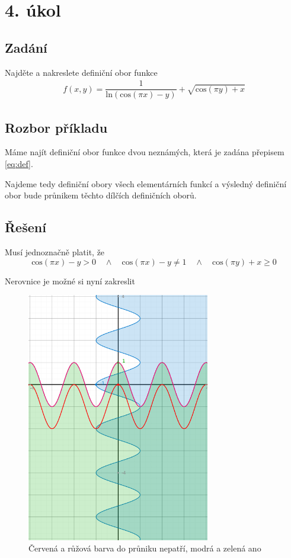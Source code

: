 \section{4. úkol}
\subsection*{Zadání}
Najděte a nakreslete definiční obor funkce 
\begin{eqnarray}f(x,y) = \dfrac{1}{\mathrm{ln}(\mathrm{cos}(\pi x) - y)} + \sqrt{\mathrm{cos}(\pi y) + x}
\label{eq:def}
\end{eqnarray}
\subsection*{Rozbor příkladu}
Máme najít definiční obor funkce dvou neznámých, která je zadána přepisem \ref{eq:def}. 

Najdeme tedy definiční obory všech elementárních funkcí a výsledný definiční obor bude průnikem těchto dílčích definičních oborů.

\subsection*{Řešení}
Musí jednoznačně platit, že
\begin{displaymath}
\mbox{cos}(\pi x) - y  > 0 \quad \wedge \quad \mbox{cos}(\pi x) - y \neq 1 \quad \wedge \quad \mbox{cos}(\pi y) + x \geq 0
\end{displaymath}

\noindent Nerovnice je možné si nyní zakreslit

\begin{figure}[h]
  \centering
  \includegraphics[width=8cm]{assets/grafKomplet.png}
  \caption{Červená a růžová barva do průniku nepatří, modrá a zelená ano}
\end{figure}
